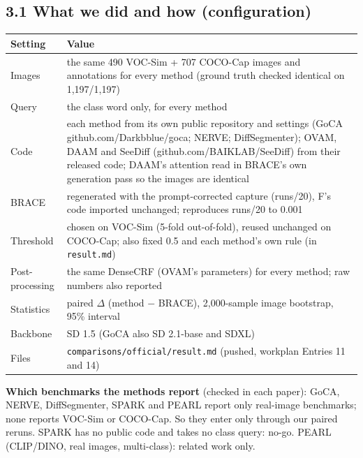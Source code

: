 \documentclass[
  10pt,
]{article}
\newcounter{none} %
\begin{document}
\subsection{3.1 What we did and how (configuration)}

{\def\LTcaptype{none} %
\begin{longtable}[]{@{}
  >{\raggedright\arraybackslash}p{}
  >{\raggedright\arraybackslash}p{}@{}}
\toprule\noalign{}
\begin{minipage}[b]{\linewidth}\raggedright
Setting
\end{minipage} & \begin{minipage}[b]{\linewidth}\raggedright
Value
\end{minipage} \\
\midrule\noalign{}
\endhead
\bottomrule\noalign{}
\endlastfoot
Images & the same 490 VOC-Sim + 707 COCO-Cap images and annotations for
every method (ground truth checked identical on 1,197/1,197) \\
Query & the class word only, for every method \\
Code & each method from its own public repository and settings (GoCA
github.com/Darkbblue/goca; NERVE; DiffSegmenter); OVAM, DAAM and SeeDiff
(github.com/BAIKLAB/SeeDiff) from their released code; DAAM's attention
read in BRACE's own generation pass so the images are identical \\
BRACE & regenerated with the prompt-corrected capture (runs/20), F's
code imported unchanged; reproduces runs/20 to 0.001 \\
Threshold & chosen on VOC-Sim (5-fold out-of-fold), reused unchanged on
COCO-Cap; also fixed 0.5 and each method's own rule (in
\texttt{result.md}) \\
Post-processing & the same DenseCRF (OVAM's parameters) for every
method; raw numbers also reported \\
Statistics & paired \ensuremath{\Delta} (method \ensuremath{-} BRACE), 2,000-sample image bootstrap,
95\% interval \\
Backbone & SD 1.5 (GoCA also SD 2.1-base and SDXL) \\
Files & \texttt{comparisons/official/result.md} (pushed, workplan
Entries 11 and 14) \\
\end{longtable}
}

\textbf{Which benchmarks the methods report} (checked in each paper):
GoCA, NERVE, DiffSegmenter, SPARK and PEARL report only real-image
benchmarks; none reports VOC-Sim or COCO-Cap. So they enter only through
our paired reruns. SPARK has no public code and takes no class query:
no-go. PEARL (CLIP/DINO, real images, multi-class): related work only.
\end{document}
